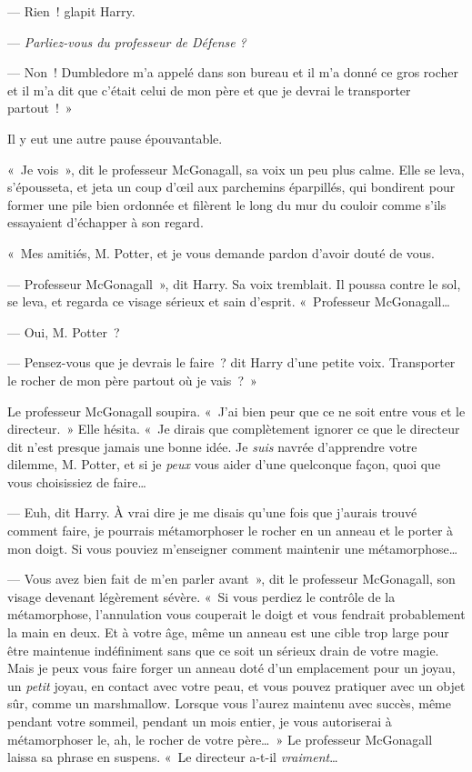 --- Rien~! glapit Harry.

--- \emph{Parliez-vous du professeur de Défense} \emph{?}

--- Non~! Dumbledore m'a appelé dans son bureau et il m'a donné ce gros rocher et il m'a dit que c'était celui de mon père et que je devrai le transporter partout~!~»

Il y eut une autre pause épouvantable.

«~Je vois~», dit le professeur McGonagall, sa voix un peu plus calme. Elle se leva, s'épousseta, et jeta un coup d'œil aux parchemins éparpillés, qui bondirent pour former une pile bien ordonnée et filèrent le long du mur du couloir comme s'ils essayaient d'échapper à son regard.

«~Mes amitiés, M. Potter, et je vous demande pardon d'avoir douté de vous.

--- Professeur McGonagall~», dit Harry. Sa voix tremblait. Il poussa contre le sol, se leva, et regarda ce visage sérieux et sain d'esprit. «~Professeur McGonagall…

--- Oui, M. Potter~?

--- Pensez-vous que je devrais le faire~? dit Harry d'une petite voix. Transporter le rocher de mon père partout où je vais~?~»

Le professeur McGonagall soupira. «~J'ai bien peur que ce ne soit entre vous et le directeur.~» Elle hésita. «~Je dirais que complètement ignorer ce que le directeur dit n'est presque jamais une bonne idée. Je \emph{suis} navrée d'apprendre votre dilemme, M. Potter, et si je \emph{peux} vous aider d'une quelconque façon, quoi que vous choisissiez de faire…

--- Euh, dit Harry. À vrai dire je me disais qu'une fois que j'aurais trouvé comment faire, je pourrais métamorphoser le rocher en un anneau et le porter à mon doigt. Si vous pouviez m'enseigner comment maintenir une métamorphose…

--- Vous avez bien fait de m'en parler avant~», dit le professeur McGonagall, son visage devenant légèrement sévère. «~Si vous perdiez le contrôle de la métamorphose, l'annulation vous couperait le doigt et vous fendrait probablement la main en deux. Et à votre âge, même un anneau est une cible trop large pour être maintenue indéfiniment sans que ce soit un sérieux drain de votre magie. Mais je peux vous faire forger un anneau doté d'un emplacement pour un joyau, un \emph{petit} joyau, en contact avec votre peau, et vous pouvez pratiquer avec un objet sûr, comme un marshmallow. Lorsque vous l'aurez maintenu avec succès, même pendant votre sommeil, pendant un mois entier, je vous autoriserai à métamorphoser le, ah, le rocher de votre père…~» Le professeur McGonagall laissa sa phrase en suspens. «~Le directeur a-t-il \emph{vraiment}…

